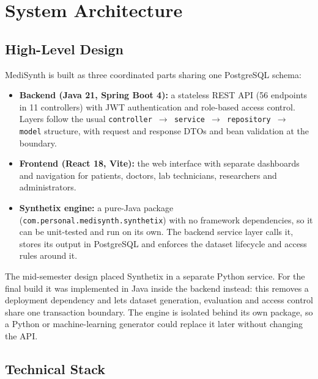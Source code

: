 \documentclass{tietreport}
\begin{document}
\section{System Architecture}

\subsection{High-Level Design}

MediSynth is built as three coordinated parts sharing one PostgreSQL schema:

\begin{itemize}
  \item \textbf{Backend (Java 21, Spring Boot 4):} a stateless REST API
    (56 endpoints in 11 controllers) with JWT authentication and role-based
    access control. Layers follow the usual \texttt{controller $\rightarrow$
    service $\rightarrow$ repository $\rightarrow$ model} structure, with
    request and response DTOs and bean validation at the boundary.
  \item \textbf{Frontend (React 18, Vite):} the web interface with separate
    dashboards and navigation for patients, doctors, lab technicians,
    researchers and administrators.
  \item \textbf{Synthetix engine:} a pure-Java package
    (\texttt{com.personal.medisynth.synthetix}) with no framework
    dependencies, so it can be unit-tested and run on its own. The backend
    service layer calls it, stores its output in PostgreSQL and enforces the
    dataset lifecycle and access rules around it.
\end{itemize}

The mid-semester design placed Synthetix in a separate Python service. For
the final build it was implemented in Java inside the backend instead: this
removes a deployment dependency and lets dataset generation, evaluation and
access control share one transaction boundary. The engine is isolated behind
its own package, so a Python or machine-learning generator could replace it
later without changing the API.

\subsection{Technical Stack}
\end{document}
